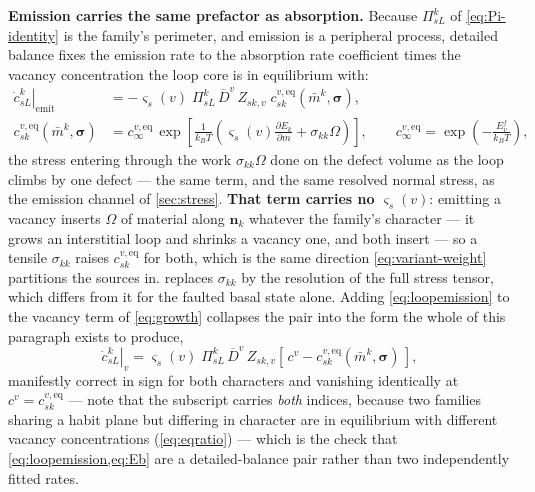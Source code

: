 \documentclass{article}
\newcommand{\nvec}{\bm n}
\begin{document}
\textbf{Emission carries the same prefactor as absorption.} Because
$\Pi^k_{sL}$ of \cref{eq:Pi-identity} is the family's perimeter, and emission is
a peripheral process, detailed balance fixes the emission rate to the absorption
rate coefficient times the vacancy concentration the loop core is in equilibrium
with:
\begin{align}
  \left.\dot c^k_{sL}\right|_{\mathrm{emit}}
  &=-\varsigma_s(v)\;\Pi^k_{sL}\,\overline D^{v}\,Z_{sk,v}\;
     c^{v,\mathrm{eq}}_{sk}(\bar m^k,\bm\sigma),
  \label{eq:loopemission}\\
  c^{v,\mathrm{eq}}_{sk}(\bar m^k,\bm\sigma)
  &=c^{v,\mathrm{eq}}_{\infty}\,
    \exp\!\left[\frac{1}{k_BT}
      \left(\varsigma_s(v)\frac{\partial E_k}{\partial m}
            +\sigma_{kk}\Omega\right)\right],
  \qquad
  c^{v,\mathrm{eq}}_{\infty}=\exp\!\left(-\frac{E^f_v}{k_BT}\right),
  \label{eq:cveq}
\end{align}
the stress entering through the work $\sigma_{kk}\Omega$ done on the defect
volume as the loop climbs by one defect --- the same term, and the same resolved
normal stress, as the emission channel of \cref{sec:stress}. \textbf{That term
carries no $\varsigma_s(v)$}: emitting a vacancy inserts $\Omega$ of material
along $\nvec_k$ whatever the family's character --- it grows an interstitial loop
and shrinks a vacancy one, and both insert --- so a tensile $\sigma_{kk}$ raises
$c^{v,\mathrm{eq}}_{sk}$ for both, which is the same direction
\cref{eq:variant-weight} partitions the sources in.
 replaces $\sigma_{kk}$ by the resolution of the full stress
tensor, which differs from it for the faulted basal state alone. Adding
\cref{eq:loopemission} to the vacancy term of \cref{eq:growth} collapses the pair
into the form the whole of this paragraph exists to produce,
\begin{equation}
  \left.\dot c^k_{sL}\right|_{v}
  =\varsigma_s(v)\;\Pi^k_{sL}\,\overline D^{v}\,Z_{sk,v}
   \left[\,c^{v}-c^{v,\mathrm{eq}}_{sk}(\bar m^k,\bm\sigma)\,\right],
  \label{eq:netvac}
\end{equation}
manifestly correct in sign for both characters and vanishing identically at
$c^v=c^{v,\mathrm{eq}}_{sk}$ --- note that the subscript carries \emph{both}
indices, because two families sharing a habit plane but differing in character
are in equilibrium with different vacancy concentrations
(\cref{eq:eqratio}) --- which is the check that \cref{eq:loopemission,eq:Eb}
are a detailed-balance pair rather than two independently fitted rates.
\end{document}
